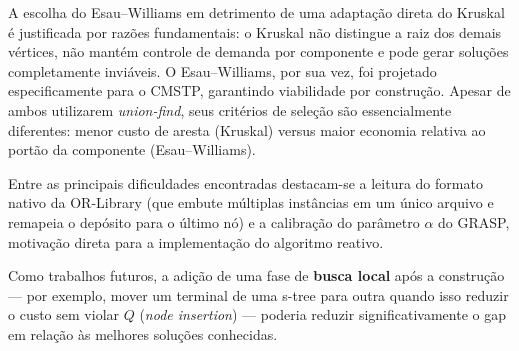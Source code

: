 \documentclass[12pt]{article}
\begin{document}
A escolha do Esau--Williams em detrimento de uma adaptação direta do Kruskal é justificada por razões fundamentais: o Kruskal não distingue a raiz dos demais vértices, não mantém controle de demanda por componente e pode gerar soluções completamente inviáveis. O Esau--Williams, por sua vez, foi projetado especificamente para o CMSTP, garantindo viabilidade por construção. Apesar de ambos utilizarem \textit{union-find}, seus critérios de seleção são essencialmente diferentes: menor custo de aresta (Kruskal) versus maior economia relativa ao portão da componente (Esau--Williams).

Entre as principais dificuldades encontradas destacam-se a leitura do formato nativo da OR-Library (que embute múltiplas instâncias em um único arquivo e remapeia o depósito para o último nó) e a calibração do parâmetro $\alpha$ do GRASP, motivação direta para a implementação do algoritmo reativo.

Como trabalhos futuros, a adição de uma fase de \textbf{busca local} após a construção --- por exemplo, mover um terminal de uma s-tree para outra quando isso reduzir o custo sem violar $Q$ (\textit{node insertion}) --- poderia reduzir significativamente o gap em relação às melhores soluções conhecidas.




\end{document}
